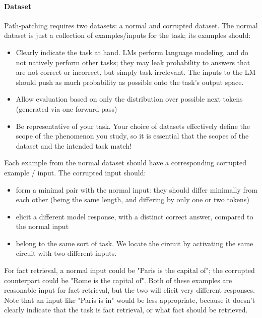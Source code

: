 \documentclass{article}
\begin{document}
    \paragraph{Dataset} Path-patching requires two datasets: a normal and corrupted dataset. The normal dataset is just a collection of examples/inputs for the task; its examples should:
    
    \begin{itemize}
        \item Clearly indicate the task at hand. LMs perform language modeling, and do not natively perform other tasks; they may leak probability to answers that are not correct or incorrect, but simply task-irrelevant. The inputs to the LM should push as much probability as possible onto the task's output space.
        \item Allow evaluation based on only the distribution over possible next tokens (generated via one forward pass)
        \item Be representative of your task. Your choice of datasets effectively define the scope of the phenomenon you study, so it is essential that the scopes of the dataset and the intended task match!
    \end{itemize}
    
    Each example from the normal dataset should have a corresponding corrupted example / input. The corrupted input should:

    \begin{itemize}
        \item form a minimal pair with the normal input: they should differ minimally from each other (being the same length, and differing by only one or two tokens)
        \item elicit a different model response, with a distinct correct answer, compared to the normal input
        \item belong to the same sort of task. We locate the circuit by activating the same circuit with two different inputs.
    \end{itemize}
    
    For fact retrieval, a normal input could be "Paris is the capital of"; the corrupted counterpart could be "Rome is the capital of". Both of these examples are reasonable input for fact retrieval, but the two will elicit very different responses. Note that an input like "Paris is in" would be less appropriate, because it doesn't clearly indicate that the task is fact retrieval, or what fact should be retrieved.
\end{document}
